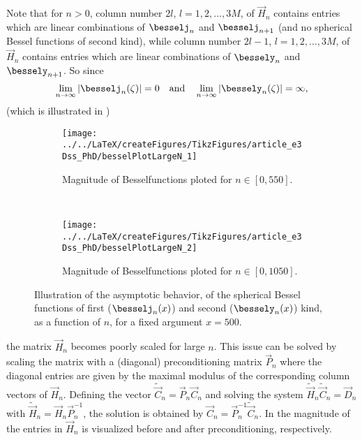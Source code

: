 Note that for $n>0$, column number $2l$, $l=1, 2, \dots, 3M$, of $\vec{H}_n$ contains entries which are linear combinations of $\besselj_n$ and $\besselj_{n+1}$ (and no spherical Bessel functions of second kind), while column number $2l-1$, $l=1, 2, \dots, 3M$, of $\vec{H}_n$ contains entries which are linear combinations of $\bessely_n$ and $\bessely_{n+1}$. So since
\begin{equation}
	\lim_{n\to\infty} |\besselj_n(\zeta)| = 0\quad\text{and}\quad \lim_{n\to\infty} |\bessely_n(\zeta)| = \infty,
\end{equation}
(which is illustrated in )
\begin{figure}
	\centering
	\begin{subfigure}[t]{0.48\textwidth}
		\centering
		\texttt{[image: ../../LaTeX/createFigures/TikzFigures/article\_e3Dss\_PhD/besselPlotLargeN\_1]}
		\caption{Magnitude of Besselfunctions ploted for ${n\in[0,550]}$.}
	\end{subfigure}
	~
	\begin{subfigure}[t]{0.48\textwidth}
		\centering
		\texttt{[image: ../../LaTeX/createFigures/TikzFigures/article\_e3Dss\_PhD/besselPlotLargeN\_2]}
		\caption{Magnitude of Besselfunctions ploted for $n\in[0,1050]$.}
	\end{subfigure}
	\caption{Illustration of the asymptotic behavior, of the spherical Bessel functions of first ($\besselj_n(x)$) and second ($\bessely_n(x)$) kind, as a function of $n$, for a fixed argument $x=500$.}
	\label{Fig1:besselPlotLargeN}
\end{figure}
the matrix $\vec{H}_n$ becomes poorly scaled for large $n$. This issue can be solved by scaling the matrix with a (diagonal) preconditioning matrix $\vec{P}_n$ where the diagonal entries are given by the maximal modulus of the corresponding column vectors of $\vec{H}_n$. Defining the vector $\tilde{\vec{C}}_n = \vec{P}_n\vec{C}_n$ and solving the system $\tilde{\vec{H}}_n\tilde{\vec{C}}_n = \vec{D}_n$ with $\tilde{\vec{H}}_n = \vec{H}_n \vec{P}_n^{-1}$, the solution is obtained by $\vec{C}_n = \vec{P}_n^{-1}\tilde{\vec{C}}_n$. In  the magnitude of the entries in $\vec{H}_n$ is visualized before and after preconditioning, respectively.

